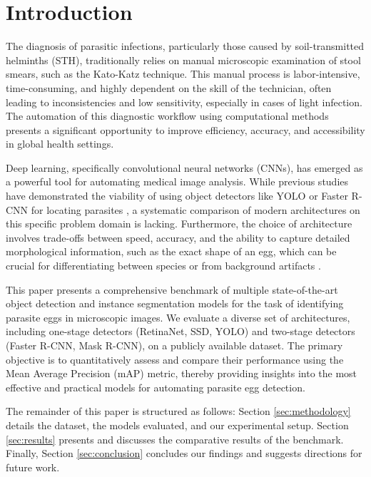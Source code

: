 \section{Introduction}
\label{sec:introduction}

The diagnosis of parasitic infections, particularly those caused by soil-transmitted helminths (STH), traditionally relies on manual microscopic examination of stool smears, such as the Kato-Katz technique. This manual process is labor-intensive, time-consuming, and highly dependent on the skill of the technician, often leading to inconsistencies and low sensitivity, especially in cases of light infection. The automation of this diagnostic workflow using computational methods presents a significant opportunity to improve efficiency, accuracy, and accessibility in global health settings.

Deep learning, specifically convolutional neural networks (CNNs), has emerged as a powerful tool for automating medical image analysis. While previous studies have demonstrated the viability of using object detectors like YOLO or Faster R-CNN for locating parasites \cite{viet2019parasite, wang2024automated}, a systematic comparison of modern architectures on this specific problem domain is lacking. Furthermore, the choice of architecture involves trade-offs between speed, accuracy, and the ability to capture detailed morphological information, such as the exact shape of an egg, which can be crucial for differentiating between species or from background artifacts \cite{cringoli2024automating}.

This paper presents a comprehensive benchmark of multiple state-of-the-art object detection and instance segmentation models for the task of identifying parasite eggs in microscopic images. We evaluate a diverse set of architectures, including one-stage detectors (RetinaNet, SSD, YOLO) and two-stage detectors (Faster R-CNN, Mask R-CNN), on a publicly available dataset. The primary objective is to quantitatively assess and compare their performance using the Mean Average Precision (mAP) metric, thereby providing insights into the most effective and practical models for automating parasite egg detection.

The remainder of this paper is structured as follows: Section \ref{sec:methodology} details the dataset, the models evaluated, and our experimental setup. Section \ref{sec:results} presents and discusses the comparative results of the benchmark. Finally, Section \ref{sec:conclusion} concludes our findings and suggests directions for future work.
